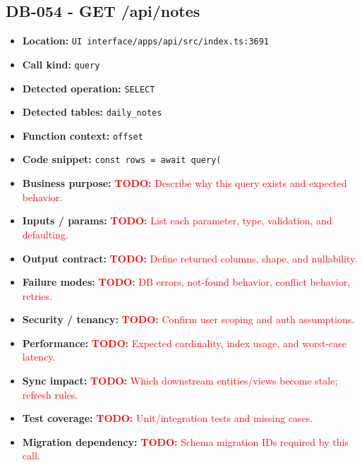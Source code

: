 \documentclass[11pt]{article}
\newcommand{\todoitem}[1]{\textcolor{red}{\textbf{TODO:} #1}}
\begin{document}
\subsection{DB-054 - GET /api/notes}
\begin{itemize}[leftmargin=1.5em]
\item \textbf{Location:} \texttt{UI interface/apps/api/src/index.ts:3691}
\item \textbf{Call kind:} \texttt{query}
\item \textbf{Detected operation:} \texttt{SELECT}
\item \textbf{Detected tables:} \texttt{daily\_notes}
\item \textbf{Function context:} \texttt{offset}
\item \textbf{Code snippet:} \texttt{const rows = await query(}
\item \textbf{Business purpose:} \todoitem{Describe why this query exists and expected behavior.}
\item \textbf{Inputs / params:} \todoitem{List each parameter, type, validation, and defaulting.}
\item \textbf{Output contract:} \todoitem{Define returned columns, shape, and nullability.}
\item \textbf{Failure modes:} \todoitem{DB errors, not-found behavior, conflict behavior, retries.}
\item \textbf{Security / tenancy:} \todoitem{Confirm user scoping and auth assumptions.}
\item \textbf{Performance:} \todoitem{Expected cardinality, index usage, and worst-case latency.}
\item \textbf{Sync impact:} \todoitem{Which downstream entities/views become stale; refresh rules.}
\item \textbf{Test coverage:} \todoitem{Unit/integration tests and missing cases.}
\item \textbf{Migration dependency:} \todoitem{Schema migration IDs required by this call.}
\end{itemize}
\end{document}
